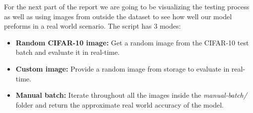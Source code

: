 For the next part of the report we are going to be visualizing the testing process as well as 
using images from outside the dataset to see how well our model preforms in a real world scenario.
The script has 3 modes:
\begin{itemize}
    \item \textbf{Random CIFAR-10 image:} Get a random image from the CIFAR-10 test batch and evaluate 
    it in real-time.
    \item \textbf{Custom image:} Provide a random image from storage to evaluate in real-time.
    \item \textbf{Manual batch:} Iterate throughout all the images inside the \textit{manual-batch/} folder 
    and return the approximate real world accuracy of the model.
\end{itemize}

